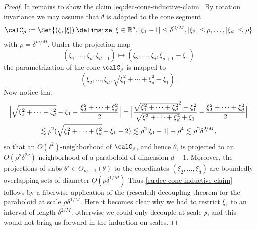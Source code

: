 \begin{proof}
It remains to show the claim \eqref{eq:dec-cone-inductive-claim}.
By rotation invariance we may assume that $\theta$ is adapted to the cone segment
\[
\calC_{\rho} := \Set{(\xi,\abs{\xi}) \given \xi\in\R^{d}, \abs{\xi_{1}-1} \leq \delta^{2/M}, \abs{\xi_{2}}\leq \rho, \dotsc, \abs{\xi_{d}}\leq \rho}
\]
with $\rho = \delta^{m/M}$.
Under the projection map
\[
(\xi_{1},\dotsc,\xi_{d},\xi_{d+1}) \mapsto (\xi_{2},\dotsc,\xi_{d},\xi_{d+1}-\xi_{1})
\]
the parametrization of the cone $\calC_{\rho}$ is mapped to
\[
(\xi_{2},\dotsc,\xi_{d},\sqrt{\xi_{1}^{2}+\dotsb+\xi_{d}^{2}}-\xi_{1}).
\]
Now notice that
\begin{multline*}
\abs[\Big]{\sqrt{\xi_{1}^{2}+\dotsb+\xi_{d}^{2}}-\xi_{1}-\frac{\xi_{2}^{2}+\dotsb+\xi_{d}^{2}}{2}}
=
\abs[\Big]{\frac{\sqrt{\xi_{1}^{2}+\dotsb+\xi_{d}^{2}}^{2}-\xi_{1}^{2}}{\sqrt{\xi_{1}^{2}+\dotsb+\xi_{d}^{2}}+\xi_{1}}-\frac{\xi_{2}^{2}+\dotsb+\xi_{d}^{2}}{2}}\\
\lesssim
\rho^{2}(\sqrt{\xi_{1}^{2}+\dotsb+\xi_{d}^{2}}+\xi_{1}-2)
\lesssim
\rho^{2}\abs{\xi_{1}-1} + \rho^{4}
\lesssim
\rho^{2}\delta^{2/M},
\end{multline*}
so that an $O(\delta^{2})$-neighborhood of $\calC_{\rho}$, and hence $\theta$, is projected to an $O(\rho^{2}\delta^{2\nu})$-neighborhood of a paraboloid of dimension $d-1$.
Moreover, the projections of slabs $\theta' \in \Theta_{m+1}(\theta)$ to the coordinates $(\xi_{2},\dotsc,\xi_{d})$ are boundedly overlapping sets of diameter $O(\rho\delta^{1/M})$
Thus \eqref{eq:dec-cone-inductive-claim} follows by a fiberwise application of the (rescaled) decoupling theorem for the paraboloid at scale $\rho\delta^{1/M}$.
Here it becomes clear why we had to restrict $\xi_{1}$ to an interval of length $\delta^{2/M}$: otherwise we could only decouple at scale $\rho$, and this would not bring us forward in the induction on scales.
\end{proof}

